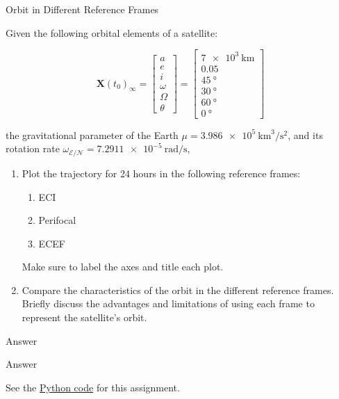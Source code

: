 \begin{hwkProblem}{2}{Orbit in Different Reference Frames} \label{hwk:p02}

	Given the following orbital elements of a satellite:

	\[
		\boldsymbol{X}\left(t_0\right)_{\infty}=\left[\begin{array}{c}
				a \\
				e \\
				i \\
				\omega \\
				\Omega \\
				\theta
				\end{array}\right]=\left[\begin{array}{cc}
				\qty{7e3}{\km} \\
				0.05 \\
				\qty{45}{\degree} \\
				\qty{30}{\degree} \\
				\qty{60}{\degree} \\
				\qty{0}{\degree}
		\end{array}\right]
	\]

	the gravitational parameter of the Earth \( \mu = \qty{3.986e5}{\km\cubed \per \s\squared} \), and its rotation rate \( \omega_{\mathcal{E}/\mathcal{N}}= \qty{7.2911e-5}{\radian\per\s} \),

	\begin{enumerate}
		\item \label{hwk:p02a} Plot the trajectory for 24 hours in the following reference frames:
			\begin{enumerate}
				\item \label{hwk:p02a1} ECI
				\item \label{hwk:p02a2} Perifocal
				\item \label{hwk:p02a3} ECEF
			\end{enumerate}
			Make sure to label the axes and title each plot.
		\item \label{hwk:p02b} Compare the characteristics of the orbit in the different reference frames. Briefly discuss the advantages and limitations of using each frame to represent the satellite’s orbit.
	\end{enumerate}

	\hwkSol{} \label{hwk:s02}

	\hwkPart{} \label{hwk:s02a}

	Answer

	\hwkPart{} \label{hwk:s02b}

	Answer

	\hwkCode{} \label{code:s02}

	See the \href{https://www.github.com/vaisriv/enae441-hw02/blob/main/code/hw02.py}{Python code} for this assignment.

\end{hwkProblem}

